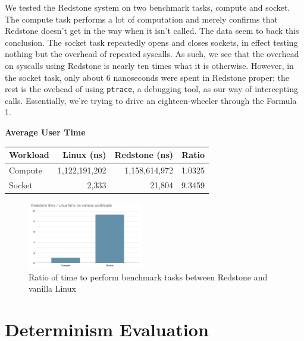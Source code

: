 {\fontsize{12}{15}\selectfont 
We tested the Redstone system on two benchmark tasks,
compute and socket.
The compute task performs a lot of computation and merely confirms that Redstone doesn't get in the way when it isn't called.
The data seem to back this conclusion.
The socket task repeatedly opens and closes sockets,
in effect testing nothing but the overhead of repeated syscalls.
As such, we see that the overhead on syscalls using Redstone is nearly ten times what it is otherwise.
However, in the socket task, only about 6 nanoseconds were spent in Redstone proper:
the rest is the ovehead of using \texttt{ptrace}, a debugging tool,
as our way of intercepting calls.
Essentially, we're trying to drive an eighteen-wheeler through the Formula 1.

\textbf{Average User Time}
\begin{tabular}{|l|r r| r|}
\hline
Workload & Linux (ns) &  Redstone (ns) & Ratio \\
\hline
Compute & 1,122,191,202 & 1,158,614,972 & 1.0325 \\
Socket  & 2,333 & 21,804 & 9.3459 \\
\hline
\end{tabular}

\begin{figure}[h]
\includegraphics[width=0.45\textwidth]{redstone_performance.png}
\caption{Ratio of time to perform benchmark tasks between Redstone and vanilla Linux}
\end{figure}

}

\section{\txtrsdust Determinism Evaluation}

